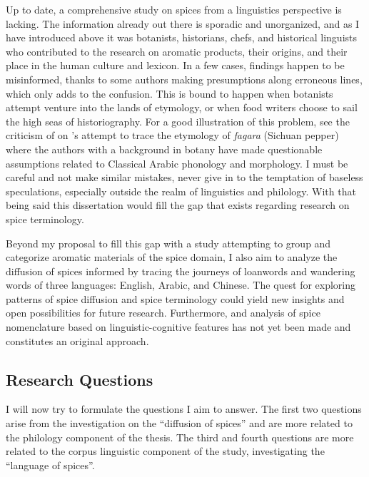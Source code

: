 Up to date, a comprehensive study on spices from a linguistics perspective is lacking. The information already out there is sporadic and unorganized, and as I have introduced above it was botanists, historians, chefs, and historical linguists who contributed to the research on aromatic products, their origins, and their place in the human culture and lexicon. In a few cases, findings happen to be misinformed, thanks to some authors making presumptions along erroneous lines, which only adds to the confusion. This is bound to happen when botanists attempt venture into the lands of etymology, or when food writers choose to sail the high seas of historiography. For a good illustration of this problem, see the criticism of \textcite{haw_cinnamon_2017} on \textcite{austin_sichuan_2008}'s attempt to trace the etymology of \textit{fagara} (Sichuan pepper) where the authors with a background in botany have made questionable assumptions related to Classical Arabic phonology and morphology. I must be careful and not make similar mistakes, never give in to the temptation of baseless speculations, especially outside the realm of linguistics and philology. With that being said this dissertation would fill the gap that exists regarding research on spice terminology.


Beyond my proposal to fill this gap with a study attempting to group and categorize aromatic materials of the spice domain, I also aim to analyze the diffusion of spices informed by tracing the journeys of loanwords and wandering words of three languages: English, Arabic, and Chinese. The quest for exploring patterns of spice diffusion and spice terminology could yield new insights and open possibilities for future research. Furthermore, and analysis of spice nomenclature based on linguistic-cognitive features has not yet been made and constitutes an original approach. 

\subsection{Research Questions}
\label{sec:research_questions}

I will now try to formulate the questions I aim to answer. The first two questions arise from the investigation on the ``diffusion of spices'' and are more related to the philology component of the thesis. The third and fourth questions are more related to the corpus linguistic component of the study, investigating the ``language of spices''. 

